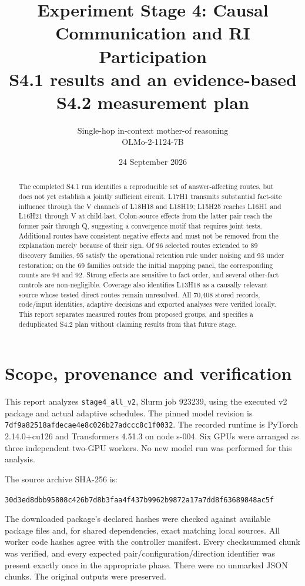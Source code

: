 \documentclass[11pt,a4paper]{article}
\title{Experiment Stage 4: Causal Communication and RI Participation\\
\large S4.1 results and an evidence-based S4.2 measurement plan}
\author{Single-hop in-context mother-of reasoning\\OLMo-2-1124-7B}
\date{24 September 2026}
\newcommand{\file}[1]{\nolinkurl{#1}}
\begin{document}
\maketitle

\begin{abstract}
The completed S4.1 run identifies a reproducible set of answer-affecting routes, but does not yet establish a jointly sufficient circuit. L17H1 transmits substantial fact-site influence through the V channels of L18H18 and L18H19; L15H25 reaches L16H1 and L16H21 through V at child-last. Colon-source effects from the latter pair reach the former pair through Q, suggesting a convergence motif that requires joint tests. Additional routes have consistent negative effects and must not be removed from the explanation merely because of their sign. Of 96 selected routes extended to 89 discovery families, 95 satisfy the operational retention rule under noising and 93 under restoration; on the 69 families outside the initial mapping panel, the corresponding counts are 94 and 92. Strong effects are sensitive to fact order, and several other-fact controls are non-negligible. Coverage also identifies L13H18 as a causally relevant source whose tested direct routes remain unresolved. All 70,408 stored records, code/input identities, adaptive decisions and exported analyses were verified locally. This report separates measured routes from proposed groups, and specifies a deduplicated S4.2 plan without claiming results from that future stage.
\end{abstract}

\setcounter{tocdepth}{1}
\tableofcontents
\newpage
\section{Scope, provenance and verification}
\label{sec:verification}
This report analyzes \file{stage4_all_v2}, Slurm job 923239, using the executed v2 package and actual adaptive schedules. The pinned model revision is
\file{7df9a82518afdecae4e8c026b27adccc8c1f0032}. The recorded runtime is PyTorch 2.14.0+cu126 and Transformers 4.51.3 on node s-004. Six GPUs were arranged as three independent two-GPU workers. No new model run was performed for this analysis.

The source archive SHA-256 is:
\par{\footnotesize\file{30d3ed8dbb95808c426b7d8b3faa4f437b9962b9872a17a7dd8f63689848ac5f}}\par
The downloaded package's declared hashes were checked against available package files and, for shared dependencies, exact matching local sources. All worker code hashes agree with the controller manifest. Every checksummed chunk was verified, and every expected pair/configuration/direction identifier was present exactly once in the appropriate phase. There were no unmarked JSON chunks. The original outputs were preserved.
\end{document}

